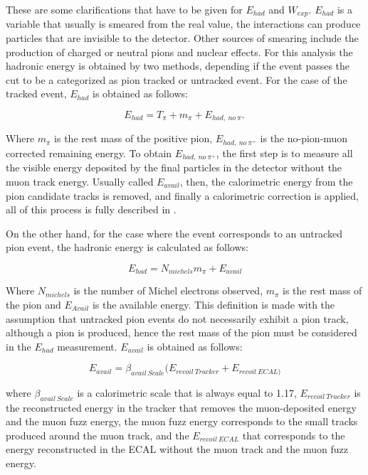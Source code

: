 These are some clarifications that have to be given for $E_{had}$ and $W_{exp}$. $E_{had}$ is a variable that usually is smeared from the real value, the interactions can produce particles that are invisible to the detector. Other sources of smearing include the production of charged or neutral pions and nuclear effects. For this analysis the hadronic energy is obtained by two methods, depending if the event passes the cut to be a categorized as pion tracked or untracked event. For the case of the tracked event, $E_{had}$ is obtained as follows:

\begin{equation}
    E_{had} = T_\pi + m_\pi + E_{had,\ no\ \pi^+}
    \label{eq:EhadTracked}
\end{equation}

Where $m_\pi$ is the rest mass of the positive pion, $E_{had,\ no\ \pi^+}$ is the  no-pion-muon corrected remaining energy. To obtain $E_{had,\ no\ \pi^+}$, the first step is to measure all the visible energy deposited by the final particles in the detector without the muon track energy. Usually called $E_{avail}$, then, the calorimetric energy from the pion candidate tracks is removed, and finally a calorimetric correction is applied, all of this process is fully described in \cite{AaronThesis}.  

On the other hand, for the case where the event corresponds to an untracked pion event, the hadronic energy is calculated as follows: 

\begin{equation}
    E_{had} = N_{michels}m_\pi + E_{avail}
    \label{eq:EhadUntracked}
\end{equation}

Where $N_{michels}$ is the number of Michel electrons observed, $m_\pi$ is the rest mass of the pion and $E_{Avail}$ is the available energy. This definition is made with the assumption that untracked pion events do not necessarily exhibit a pion track, although a pion is produced, hence the rest mass of the pion must be considered in the $E_{had}$ measurement. $E_{avail}$ is obtained as follows: 

\begin{equation}
    E_{avail} = \beta_{avail\ Scale}(E_{recoil\ Tracker} + E_{recoil\ ECAL)}
\end{equation}

where $\beta_{avail\ Scale}$ is a calorimetric scale that is always equal to 1.17, $E_{recoil\ Tracker}$ is the reconstructed energy in the tracker that removes the muon-deposited energy and the muon fuzz energy, the muon fuzz energy corresponds to the small tracks produced around the muon track, and the $E_{recoil\ ECAL}$ that corresponds to the energy reconstructed in the ECAL without the muon track and the muon fuzz energy.

